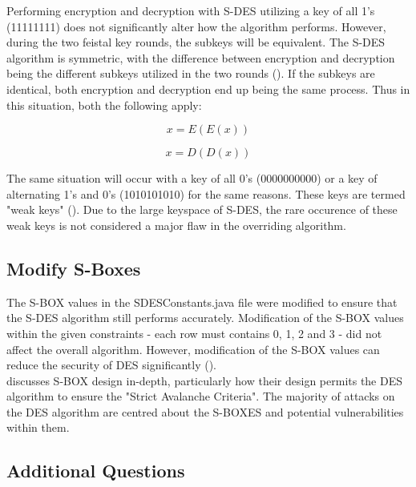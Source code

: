 \documentclass[]{article}
\begin{document}
Performing encryption and decryption with S-DES utilizing a key of all 1's (11111111) does not significantly alter how the algorithm performs. However, during the two feistal key rounds, the subkeys will be equivalent. The S-DES algorithm is symmetric, with the difference between encryption and decryption being the different subkeys utilized in the two rounds (\cite{sdes_anal}). If the subkeys are identical, both encryption and decryption end up being the same process. Thus in this situation, both the following apply:

$$x=E( E(x) )$$

$$x=D( D(x) )$$

The same situation will occur with a key of all 0's (0000000000) or a key of alternating 1's and 0's (1010101010) for the same reasons. These keys are termed "weak keys" (\cite{alttext}). Due to the large keyspace of S-DES, the rare occurence of these weak keys is not considered a major flaw in the overriding algorithm.

\subsection*{Modify S-Boxes}


The S-BOX values in the SDESConstants.java file were modified to ensure that the S-DES algorithm still performs accurately. Modification of the S-BOX values within the given constraints - each row must contains 0, 1, 2 and 3 - did not affect the overall algorithm. However, modification of the S-BOX values can reduce the security of DES significantly (\cite{maintext}).\\

\cite{sans} discusses S-BOX design in-depth, particularly how their design permits the DES algorithm to ensure the "Strict Avalanche Criteria". The majority of attacks on the DES algorithm are centred about the S-BOXES and potential vulnerabilities within them.

\break

\vspace*{-0.8cm}
\begin{center}
	\section*{Additional Questions}
\end{center}

\vspace*{0.8cm}
\end{document}
